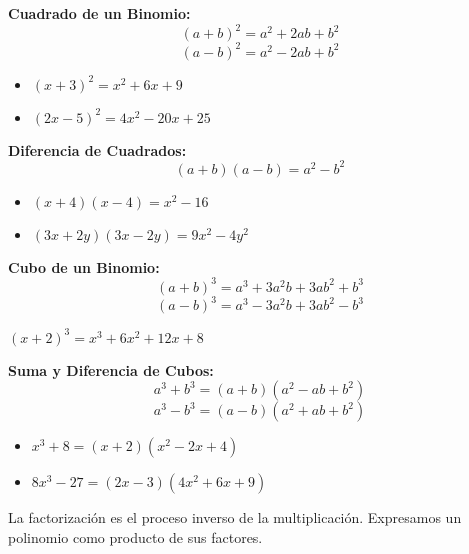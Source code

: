 
\begin{theorem}
\textbf{Cuadrado de un Binomio:}
$$(a + b)^2 = a^2 + 2ab + b^2$$
$$(a - b)^2 = a^2 - 2ab + b^2$$
\end{theorem}

\begin{example}
\begin{itemize}
\item $(x + 3)^2 = x^2 + 6x + 9$
\item $(2x - 5)^2 = 4x^2 - 20x + 25$
\end{itemize}
\end{example}

\begin{theorem}
\textbf{Diferencia de Cuadrados:}
$$(a + b)(a - b) = a^2 - b^2$$
\end{theorem}

\begin{example}
\begin{itemize}
\item $(x + 4)(x - 4) = x^2 - 16$
\item $(3x + 2y)(3x - 2y) = 9x^2 - 4y^2$
\end{itemize}
\end{example}

\begin{theorem}
\textbf{Cubo de un Binomio:}
$$(a + b)^3 = a^3 + 3a^2b + 3ab^2 + b^3$$
$$(a - b)^3 = a^3 - 3a^2b + 3ab^2 - b^3$$
\end{theorem}

\begin{example}
$(x + 2)^3 = x^3 + 6x^2 + 12x + 8$
\end{example}

\begin{theorem}
\textbf{Suma y Diferencia de Cubos:}
$$a^3 + b^3 = (a + b)(a^2 - ab + b^2)$$
$$a^3 - b^3 = (a - b)(a^2 + ab + b^2)$$
\end{theorem}

\begin{example}
\begin{itemize}
\item $x^3 + 8 = (x + 2)(x^2 - 2x + 4)$
\item $8x^3 - 27 = (2x - 3)(4x^2 + 6x + 9)$
\end{itemize}
\end{example}


La factorización es el proceso inverso de la multiplicación. Expresamos un polinomio como producto de sus factores.

